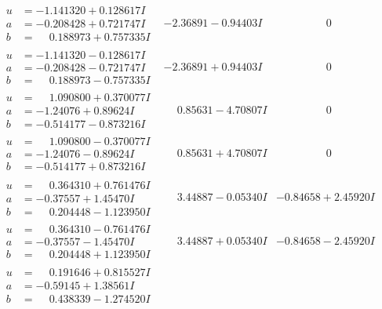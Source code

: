 \documentclass[1p]{elsarticle_modified}
\theoremstyle{definition}
\begin{document}
$$\begin{array}{c|c|c}
\begin{aligned}
u &= -1.141320 + 0.128617 I \\
a &= -0.208428 + 0.721747 I \\
b &= \phantom{-}0.188973 + 0.757335 I\end{aligned}
 & -2.36891 - 0.94403 I & \phantom{-0.000000 } 0 \\ \hline\begin{aligned}
u &= -1.141320 - 0.128617 I \\
a &= -0.208428 - 0.721747 I \\
b &= \phantom{-}0.188973 - 0.757335 I\end{aligned}
 & -2.36891 + 0.94403 I & \phantom{-0.000000 } 0 \\ \hline\begin{aligned}
u &= \phantom{-}1.090800 + 0.370077 I \\
a &= -1.24076 + 0.89624 I \\
b &= -0.514177 - 0.873216 I\end{aligned}
 & \phantom{-}0.85631 - 4.70807 I & \phantom{-0.000000 } 0 \\ \hline\begin{aligned}
u &= \phantom{-}1.090800 - 0.370077 I \\
a &= -1.24076 - 0.89624 I \\
b &= -0.514177 + 0.873216 I\end{aligned}
 & \phantom{-}0.85631 + 4.70807 I & \phantom{-0.000000 } 0 \\ \hline\begin{aligned}
u &= \phantom{-}0.364310 + 0.761476 I \\
a &= -0.37557 + 1.45470 I \\
b &= \phantom{-}0.204448 - 1.123950 I\end{aligned}
 & \phantom{-}3.44887 - 0.05340 I & -0.84658 + 2.45920 I \\ \hline\begin{aligned}
u &= \phantom{-}0.364310 - 0.761476 I \\
a &= -0.37557 - 1.45470 I \\
b &= \phantom{-}0.204448 + 1.123950 I\end{aligned}
 & \phantom{-}3.44887 + 0.05340 I & -0.84658 - 2.45920 I \\ \hline\begin{aligned}
u &= \phantom{-}0.191646 + 0.815527 I \\
a &= -0.59145 + 1.38561 I \\
b &= \phantom{-}0.438339 - 1.274520 I\end{aligned}

\end{array}$$
\end{document}
